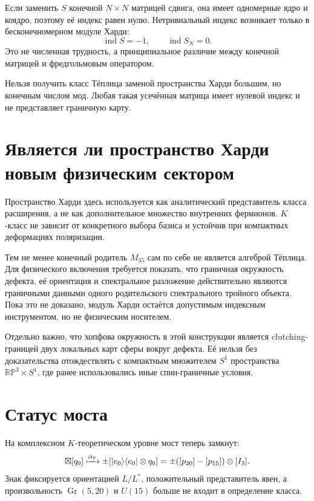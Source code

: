 Если заменить $S$ конечной $N\times N$ матрицей сдвига, она имеет
одномерные ядро и коядро, поэтому её индекс равен нулю. Нетривиальный
индекс возникает только в бесконечномерном модуле Харди:
\begin{equation}
 \operatorname{ind}S=-1,
 \qquad
 \operatorname{ind}S_N=0.
\end{equation}
Это не численная трудность, а принципиальное различие между конечной
матрицей и фредгольмовым оператором.

\begin{nogocriterion}
Нельзя получить класс Тёплица заменой пространства Харди большим, но
конечным числом мод. Любая такая усечённая матрица имеет нулевой индекс и
не представляет граничную карту.
\end{nogocriterion}

\section{Является ли пространство Харди новым физическим сектором}

Пространство Харди здесь используется как аналитический представитель
класса расширения, а не как дополнительное множество внутренних
фермионов. $K$-класс не зависит от конкретного выбора базиса и устойчив
при компактных деформациях поляризации.

Тем не менее конечный родитель $M_{35}$ сам по себе не является алгеброй
Тёплица. Для физического включения требуется показать, что граничная
окружность дефекта, её ориентация и спектральное разложение действительно
являются граничными данными одного родительского спектрального тройного
объекта. Пока это не доказано, модуль Харди остаётся допустимым
индексным инструментом, но не физическим носителем.

Отдельно важно, что хопфова окружность в этой конструкции является
clutching-границей двух локальных карт сферы вокруг дефекта. Её нельзя
без доказательства отождествлять с компактным множителем $S^1$ пространства
$\mathbb{RP}^3\times S^1$, где ранее использовались иные спин-граничные
условия.

\section{Статус моста}

На комплексном $K$-теоретическом уровне мост теперь замкнут:
\begin{equation}
 [u_H]\boxtimes[q_0]
 \xmapsto{\partial_{\mathcal T}}
 \pm[|e_0\rangle\langle e_0|\otimes q_0]
 =\pm([p_{20}]-[p_{15}])\otimes[I_3].
 \label{eq:v5-toeplitz-closed-class-bridge}
\end{equation}
Знак фиксируется ориентацией $L/L^*$, положительный представитель явен,
а произвольность $\operatorname{Gr}(5,20)$ и $U(15)$ больше не входит в
определение класса.

